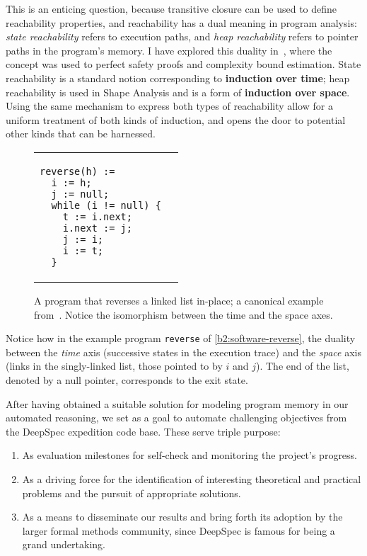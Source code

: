 This is an enticing question, because transitive closure can be used to define reachability properties,
and reachability has a dual meaning in program analysis: \emph{state reachability} refers to execution paths,
and \emph{heap reachability} refers to pointer paths in the program's memory.
I have explored this duality in~\cite{ESOP2021:Ish-Shalom},
where the concept was used to perfect safety proofs and complexity bound estimation.
State reachability is a standard notion corresponding to \textbf{induction over time};
heap reachability is used in Shape Analysis and is a form of \textbf{induction over space}.
Using the same mechanism to express both types of reachability allow for a uniform treatment of both kinds of induction, and opens the door to potential other kinds that can be harnessed.

\begin{figure}
\centering
\begin{tabular}{ll}
\begin{lstlisting}[basicstyle=\linespread{1.36}\ttfamily\fontsize{10pt}{8pt}\selectfont]
reverse(h) :=
  i := h;
  j := null;
  while (i != null) {
    t := i.next;
    i.next := j;
    j := i;
    i := t;
  }
\end{lstlisting}
&

\end{tabular}
\caption{A program that reverses a linked list in-place;
 a canonical example from~\cite{LICS2002:Reynolds}.
 Notice the isomorphism between the time and the space axes.
 }
\label{b2:software-reverse}
\end{figure}

Notice how in the example program \texttt{reverse}
of \autoref{b2:software-reverse},
the duality between the \emph{time} axis (successive states in the execution trace) and the \emph{space}
axis (links in the singly-linked list, \esp those pointed to by $i$ and $j$).
The end of the list, denoted by a null pointer,
corresponds to the exit state.

\smallskip
After having obtained a suitable solution for modeling program memory in our automated reasoning,
we set as a goal to automate challenging objectives from the DeepSpec expedition code base.
These serve triple purpose:
\begin{enumerate}
  \item As evaluation milestones for self-check and monitoring the project's progress.
  \item As a driving force for the identification of interesting theoretical and practical problems and the pursuit of appropriate solutions.
  \item As a means to disseminate our results and bring forth its adoption by the larger formal methods community, since DeepSpec is famous for being a grand undertaking.
\end{enumerate}

